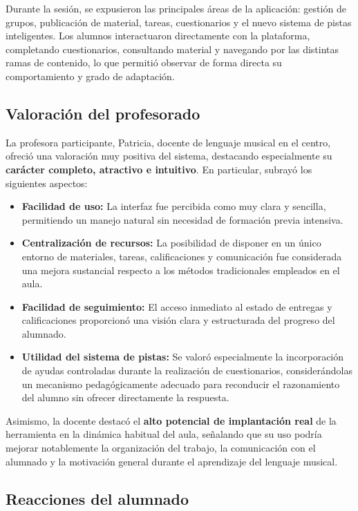 Durante la sesión, se expusieron las principales áreas de la aplicación: gestión de grupos, publicación de material, tareas, cuestionarios y el nuevo sistema de pistas inteligentes. Los alumnos interactuaron directamente con la plataforma, completando cuestionarios, consultando material y navegando por las distintas ramas de contenido, lo que permitió observar de forma directa su comportamiento y grado de adaptación.

\subsection{Valoración del profesorado}

La profesora participante, Patricia, docente de lenguaje musical en el centro, ofreció una valoración muy positiva del sistema, destacando especialmente su \textbf{carácter completo, atractivo e intuitivo}. En particular, subrayó los siguientes aspectos:

\begin{itemize}
    \item \textbf{Facilidad de uso:} La interfaz fue percibida como muy clara y sencilla, permitiendo un manejo natural sin necesidad de formación previa intensiva.
    \item \textbf{Centralización de recursos:} La posibilidad de disponer en un único entorno de materiales, tareas, calificaciones y comunicación fue considerada una mejora sustancial respecto a los métodos tradicionales empleados en el aula.
    \item \textbf{Facilidad de seguimiento:} El acceso inmediato al estado de entregas y calificaciones proporcionó una visión clara y estructurada del progreso del alumnado.
    \item \textbf{Utilidad del sistema de pistas:} Se valoró especialmente la incorporación de ayudas controladas durante la realización de cuestionarios, considerándolas un mecanismo pedagógicamente adecuado para reconducir el razonamiento del alumno sin ofrecer directamente la respuesta.
\end{itemize}

Asimismo, la docente destacó el \textbf{alto potencial de implantación real} de la herramienta en la dinámica habitual del aula, señalando que su uso podría mejorar notablemente la organización del trabajo, la comunicación con el alumnado y la motivación general durante el aprendizaje del lenguaje musical.

\subsection{Reacciones del alumnado}

